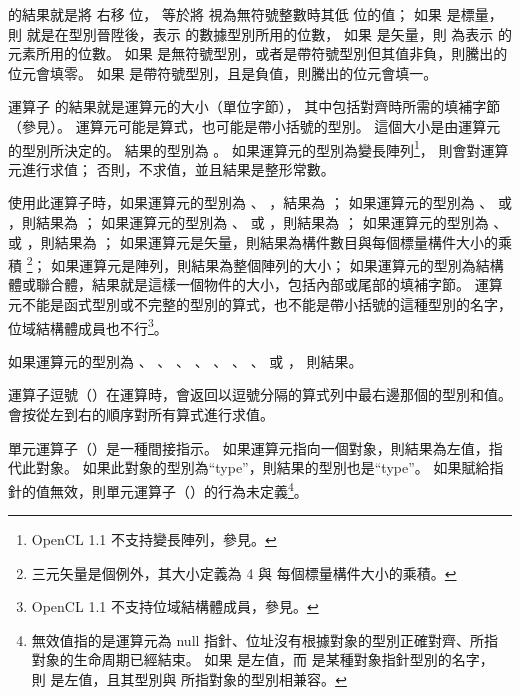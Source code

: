 { 的結果就是將  右移  位，
  等於將  視為無符號整數時其低  位的值；
如果  是標量，則  就是在型別晉陞後，表示  的數據型別所用的位數，
如果  是矢量，則  為表示  的元素所用的位數。
如果  是無符號型別，或者是帶符號型別但其值非負，則騰出的位元會填零。
如果  是帶符號型別，且是負值，則騰出的位元會填一。
\stopitem

\startitem
運算子  的結果就是運算元的大小（單位字節），
其中包括對齊時所需的填補字節（參見）。
運算元可能是算式，也可能是帶小括號的型別。
這個大小是由運算元的型別所決定的。
結果的型別為 。
如果運算元的型別為變長陣列\footnote{OpenCL 1.1 不支持變長陣列，參見。}，
則會對運算元進行求值；
否則，不求值，並且結果是整形常數。

使用此運算子時，如果運算元的型別為 、 ，結果為 ；
如果運算元的型別為 、  或 ，則結果為 ；
如果運算元的型別為 、  或 ，則結果為 ；
如果運算元的型別為 、  或 ，則結果為 ；
如果運算元是矢量，則結果為構件數目與每個標量構件大小的乘積
\footnote{三元矢量是個例外，其大小定義為 4 與 每個標量構件大小的乘積。}；
如果運算元是陣列，則結果為整個陣列的大小；
如果運算元的型別為結構體或聯合體，結果就是這樣一個物件的大小，包括內部或尾部的填補字節。
運算元不能是函式型別或不完整的型別的算式，也不能是帶小括號的這種型別的名字，
位域結構體成員也不行\footnote{OpenCL 1.1 不支持位域結構體成員，參見。}。

如果運算元的型別為 、 、 、
 、 、 、
 、  或 ，
則結果。
\stopitem

\startitem
運算子逗號（\ccmm{,}）在運算時，會返回以逗號分隔的算式列中最右邊那個的型別和值。
會按從左到右的順序對所有算式進行求值。
\stopitem

\startitem
單元運算子（\ccmm{*}）是一種間接指示。
如果運算元指向一個對象，則結果為左值，指代此對象。
如果此對象的型別為“type”，則結果的型別也是“type”。
如果賦給指針的值無效，則單元運算子（\ccmm{*}）的行為未定義\footnote{
無效值指的是運算元為 null 指針、位址沒有根據對象的型別正確對齊、所指對象的生命周期已經結束。
如果  是左值，而  是某種對象指針型別的名字，
則  是左值，且其型別與  所指對象的型別相兼容。
}。
\stopitem

}
